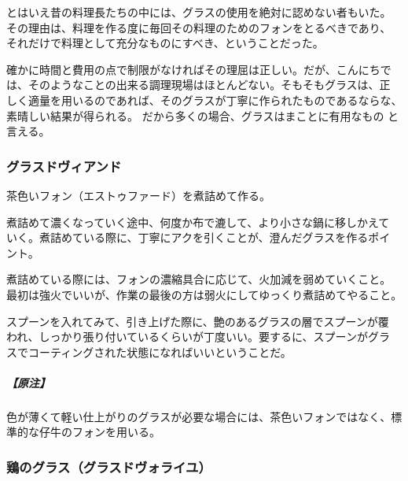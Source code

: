 \begin{recette}
とはいえ昔の料理長たちの中には、グラスの使用を絶対に認めない者もいた。
その理由は、料理を作る度に毎回その料理のためのフォンをとるべきであり、
それだけで料理として充分なものにすべき、ということだった。

確かに時間と費用の点で制限がなければその理屈は正しい。だが、こんにちで
は、そのようなことの出来る調理現場はほとんどない。そもそもグラスは、正
しく適量を用いるのであれば、そのグラスが丁寧に作られたものであるならな、
素晴しい結果が得られる。 だから多くの場合、グラスはまことに有用なもの
と言える。

\maeaki

\hypertarget{glace-de-viande}{%
\subsubsection{グラスドヴィアンド}\label{glace-de-viande}}



茶色いフォン（エストゥファード）を煮詰めて作る。

煮詰めて濃くなっていく途中、何度か布で漉して、より小さな鍋に移しかえて
いく。煮詰めている際に、丁寧にアクを引くことが、澄んだグラスを作るポイ
ント。

煮詰めている際には、フォンの濃縮具合に応じて、火加減を弱めていくこと。
最初は強火でいいが、作業の最後の方は弱火にしてゆっくり煮詰めてやること。

スプーンを入れてみて、引き上げた際に、艶のあるグラスの層でスプーンが覆
われ、しっかり張り付いているくらいが丁度いい。要するに、スプーンがグラ
スでコーティングされた状態になればいいということだ。

\hypertarget{nota-glace-de-viande}{%
\subparagraph{【原注】}\label{nota-glace-de-viande}}

色が薄くて軽い仕上がりのグラスが必要な場合には、茶色いフォンではなく、標
準的な仔牛のフォンを用いる。

\maeaki

\hypertarget{glace-de-volaille}{%
\subsubsection{鶏のグラス（グラスドヴォライユ）}\label{glace-de-volaille}}




\end{recette}
